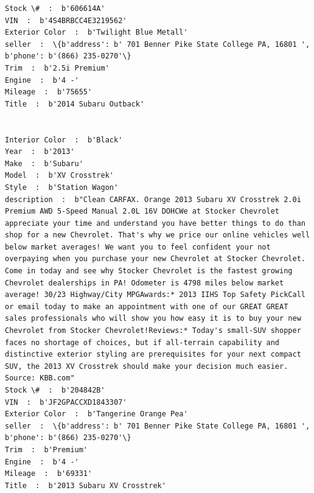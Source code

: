 \documentclass[11pt]{article}
\begin{document}
\begin{Verbatim}[commandchars=\\\{\}]
Stock \#  :  b'606614A'
VIN  :  b'4S4BRBCC4E3219562'
Exterior Color  :  b'Twilight Blue Metall'
seller  :  \{b'address': b' 701 Benner Pike State College PA, 16801 ', b'phone': b'(866) 235-0270'\}
Trim  :  b'2.5i Premium'
Engine  :  b'4 -'
Mileage  :  b'75655'
Title  :  b'2014 Subaru Outback'


Interior Color  :  b'Black'
Year  :  b'2013'
Make  :  b'Subaru'
Model  :  b'XV Crosstrek'
Style  :  b'Station Wagon'
description  :  b"Clean CARFAX. Orange 2013 Subaru XV Crosstrek 2.0i Premium AWD 5-Speed Manual 2.0L 16V DOHCWe at Stocker Chevrolet appreciate your time and understand you have better things to do than shop for a new Chevrolet. That's why we price our online vehicles well below market averages! We want you to feel confident your not overpaying when you purchase your new Chevrolet at Stocker Chevrolet. Come in today and see why Stocker Chevrolet is the fastest growing Chevrolet dealerships in PA! Odometer is 4798 miles below market average! 30/23 Highway/City MPGAwards:* 2013 IIHS Top Safety PickCall or email today to make an appointment with one of our GREAT GREAT sales professionals who will show you how easy it is to buy your new Chevrolet from Stocker Chevrolet!Reviews:* Today's small-SUV shopper faces no shortage of choices, but if all-terrain capability and distinctive exterior styling are prerequisites for your next compact SUV, the 2013 XV Crosstrek should make your decision much easier. Source: KBB.com"
Stock \#  :  b'204842B'
VIN  :  b'JF2GPACCXD1843307'
Exterior Color  :  b'Tangerine Orange Pea'
seller  :  \{b'address': b' 701 Benner Pike State College PA, 16801 ', b'phone': b'(866) 235-0270'\}
Trim  :  b'Premium'
Engine  :  b'4 -'
Mileage  :  b'69331'
Title  :  b'2013 Subaru XV Crosstrek'



\end{Verbatim}
\end{document}

